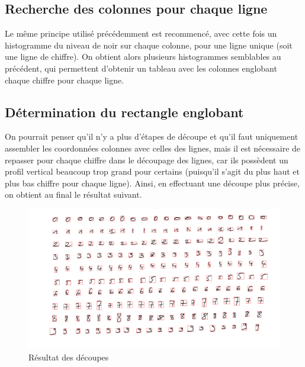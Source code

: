 \subsection{Recherche des colonnes pour chaque ligne}
Le même principe utilisé précédemment est recommencé, avec cette fois un histogramme du niveau de noir sur chaque colonne, pour une ligne unique (soit une ligne de chiffre). On obtient alors plusieurs histogrammes semblables au précédent, qui permettent d'obtenir un tableau avec les colonnes englobant chaque chiffre pour chaque ligne. 

\subsection{Détermination du rectangle englobant}
On pourrait penser qu'il n'y a plus d'étapes de découpe et qu'il faut uniquement assembler les coordonnées colonnes avec celles des lignes, mais il est nécessaire de repasser pour chaque chiffre dans le découpage des lignes, car ils possèdent un profil vertical beaucoup trop grand pour certains (puisqu'il s'agit du plus haut et plus bas chiffre pour chaque ligne). Ainsi, en effectuant une découpe plus précise, on obtient au final le résultat suivant.

\begin{figure}[hm]
	\begin{center}
		\includegraphics[width=\textwidth]{img/11-final-cut.png} 
	\end{center}
	\caption{Résultat des découpes}
\end{figure}
\newpage
